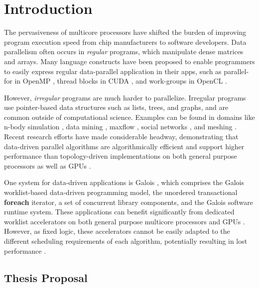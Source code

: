 %
\section{Introduction}\label{sect:problem}

The pervasiveness of multicore processors have shifted the burden of improving program execution speed from chip 
manufacturers to software developers. Data parallelism often occurs in \textit{regular} programs, which manipulate 
dense matrices and arrays. Many language constructs have been proposed to enable programmers to easily express 
regular data-parallel application in their apps, such as parallel-for in OpenMP \cite{openmpScheduling}, thread 
blocks in CUDA \cite{cuda}, and work-groups in OpenCL \cite{opencl}.

However, \textit{irregular} programs are much harder to parallelize. Irregular programs use pointer-based data 
structures such as lists, trees, and graphs, and are common outside of computational science. Examples can be found 
in domains like n-body simulation \cite{barneshut}, data mining \cite{datamining}, 
maxflow \cite{cormen}, social networks \cite{communityDiscovery}, 
and meshing \cite{dmr}. Recent research efforts have made considerable headway, demonstrating that data-driven 
parallel algorithms are algorithmically efficient and support higher performance than topology-driven 
implementations on both general purpose processors \cite{galoisVsVertex} \cite{thinkLikeVertex} as well as GPUs 
\cite{galoisGPU} \cite{datavstopGPU}.

One system for data-driven applications is Galois \cite{galois}, which comprises the Galois worklist-based 
data-driven programming model, the unordered transactional \textbf{foreach} iterator, a set of concurrent library 
components, and the Galois software runtime system. These applications can benefit significantly from dedicated 
worklist accelerators on both general purpose multicore processors \cite{carbon} and GPUs \cite{gpuWorklist}. 
However, as fixed logic, these accelerators cannot be easily adapted to the different scheduling requirements of 
each algorithm, potentially resulting in lost performance \cite{galoisOrdering}.


\subsection{Thesis Proposal}

